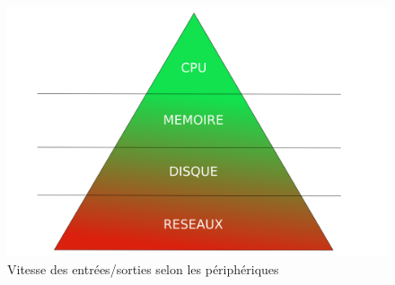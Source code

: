 {  \begin{figure}[h]
    \begin{center}
      \includegraphics[scale=0.3]{img/pyramid-io.png}
      \caption{Vitesse des entrées/sorties selon les périphériques}
      \label{pyramid-io}
    \end{center}
  \end{figure}

}


